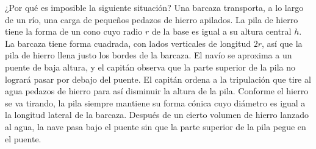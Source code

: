 \item ¿Por qué es imposible la siguiente situación? Una barcaza transporta, a lo largo de un río, una carga de pequeños pedazos de hierro apilados. La pila de hierro tiene la forma de un cono cuyo radio $r$ de la base es igual a su altura central $h$. La barcaza tiene forma cuadrada, con lados verticales de longitud $2r$, así que la pila de hierro llena justo los bordes de la barcaza. El navío se aproxima a un puente de baja altura, y el capitán observa que la parte superior de la pila no logrará pasar por debajo del puente. El capitán ordena a la tripulación que tire al agua pedazos de hierro para así disminuir la altura de la pila. Conforme el hierro se va tirando, la pila siempre mantiene su forma cónica cuyo diámetro es igual a la longitud lateral de la barcaza. Después de un cierto volumen de hierro lanzado al agua, la nave pasa bajo el puente sin que la parte superior de la pila pegue en el puente.
